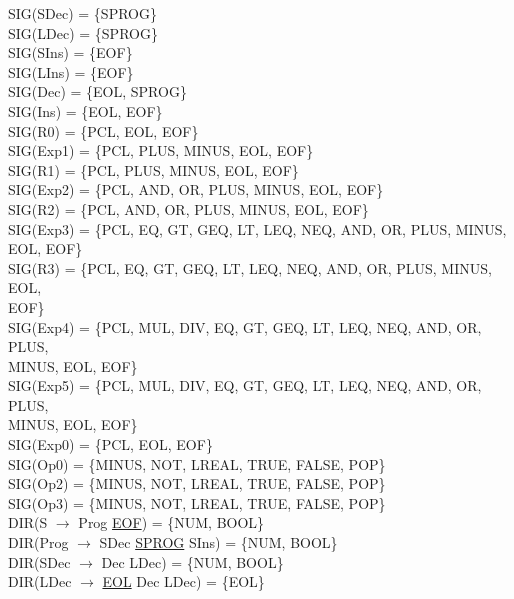 \documentclass[\main/MemoriaPL.tex]{subfiles}
\begin{document}
    SIG(SDec) = \{SPROG\}\\
    SIG(LDec) = \{SPROG\}\\
    SIG(SIns) = \{EOF\}\\
    SIG(LIns) = \{EOF\}\\
    SIG(Dec) = \{EOL, SPROG\}\\
    SIG(Ins) = \{EOL, EOF\}\\
    SIG(R0) = \{PCL, EOL, EOF\}\\
    SIG(Exp1) = \{PCL, PLUS, MINUS, EOL, EOF\}\\
    SIG(R1) = \{PCL, PLUS, MINUS, EOL, EOF\}\\
    SIG(Exp2) = \{PCL, AND, OR, PLUS, MINUS, EOL, EOF\}\\
    SIG(R2) = \{PCL, AND, OR, PLUS, MINUS, EOL, EOF\}\\
    SIG(Exp3) = \{PCL, EQ, GT, GEQ, LT, LEQ, NEQ, AND, OR, PLUS, MINUS,\\
    \hspace{26mm}EOL, EOF\}\\
    SIG(R3) = \{PCL, EQ, GT, GEQ, LT, LEQ, NEQ, AND, OR, PLUS, MINUS, EOL,\\
    \hspace{22mm}EOF\}\\
    SIG(Exp4) = \{PCL, MUL, DIV, EQ, GT, GEQ, LT, LEQ, NEQ, AND, OR, PLUS,\\
    \hspace{26mm}MINUS, EOL, EOF\}\\
    SIG(Exp5) = \{PCL, MUL, DIV, EQ, GT, GEQ, LT, LEQ, NEQ, AND, OR, PLUS,\\
    \hspace{26mm}MINUS, EOL, EOF\}\\
    SIG(Exp0) = \{PCL, EOL, EOF\}\\
    SIG(Op0) = \{MINUS, NOT, LREAL, TRUE, FALSE, POP\}\\
    SIG(Op2) = \{MINUS, NOT, LREAL, TRUE, FALSE, POP\}\\
    SIG(Op3) = \{MINUS, NOT, LREAL, TRUE, FALSE, POP\}\\
    \vspace{2mm}
    DIR(S $\rightarrow$ Prog \underline{EOF}) = \{NUM, BOOL\}\\
    DIR(Prog $\rightarrow$ SDec \underline{SPROG} SIns) = \{NUM, BOOL\}\\
    DIR(SDec $\rightarrow$ Dec LDec) = \{NUM, BOOL\}\\
    DIR(LDec $\rightarrow$ \underline{EOL} Dec LDec) = \{EOL\}\\
\end{document}
